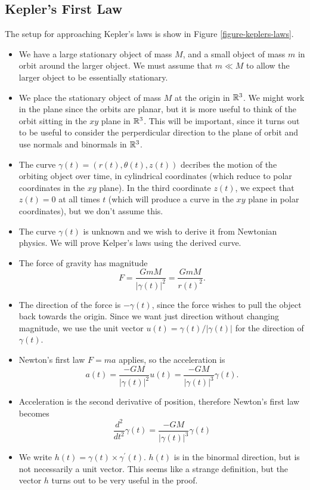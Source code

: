 \documentclass[fleqn,letterpaper]{report}
\begin{document}
\subsection{Kepler's First Law}
\label{kepler-first}

The setup for approaching Kepler's laws is show in Figure
\ref{figure-keplers-laws}.
\begin{itemize}
\item We have a large stationary object of mass $M$, and a small
object of mass $m$ in orbit around the larger object. We must
assume that $m \ll M$ to allow the larger object to be
essentially stationary.
\item We place the stationary object of mass $M$ at the origin
in $\mathbb{R}^3$. We might work in the plane since the orbits are
planar, but it is more useful to think of the orbit sitting in
the $xy$ plane in $\mathbb{R}^3$. This will be important, since it
turns out to be useful to consider the perperdicular direction
to the plane of orbit and use normals and binormals in
$\mathbb{R}^3$. 
\item The curve $\gamma(t) = (r(t),\theta(t),z(t))$ decribes the
motion of the orbiting object over time, in cylindrical
coordinates (which reduce to polar coordinates in the $xy$
plane). In the third coordinate $z(t)$, we expect
that $z(t) = 0$ at all times $t$ (which will produce a curve
in the $xy$ plane in polar coordinates), but we don't assume
this. 
\item The curve $\gamma(t)$ is unknown and we wish to derive it
from Newtonian physics. We will prove Kelper's laws using the
derived curve.
\item The force of gravity has magnitude
\begin{equation*}
F = \frac{GmM}{|\gamma(t)|^2} = \frac{GmM}{r(t)^2}.
\end{equation*}
\item The direction of the force is $-\gamma(t)$, since the
force wishes to pull the object back towards the origin. Since
we want just direction without changing magnitude, we use the
unit vector $u(t) = \gamma(t) / |\gamma(t)|$ for the direction
of $\gamma(t)$. 
\item Newton's first law $F = ma$ applies, so the acceleration
is 
\begin{equation*}
a(t) = \frac{-GM}{|\gamma(t)|^2} u(t) =
\frac{-GM}{|\gamma(t)|^3} \gamma(t).
\end{equation*}
\item Acceleration is the second derivative of position,
therefore Newton's first law becomes
\begin{equation*}
\frac{d^2}{dt^2} \gamma(t) = \frac{-GM}{|\gamma(t)|^3}
\gamma(t)
\end{equation*}
\item We write $h(t) = \gamma(t) \times \gamma^\prime(t)$.
$h(t)$ is in the binormal direction, but is not necessarily a
unit vector. This seems like a strange definition, but the
vector $h$ turns out to be very useful in the proof. 
\end{itemize}
\end{document}
